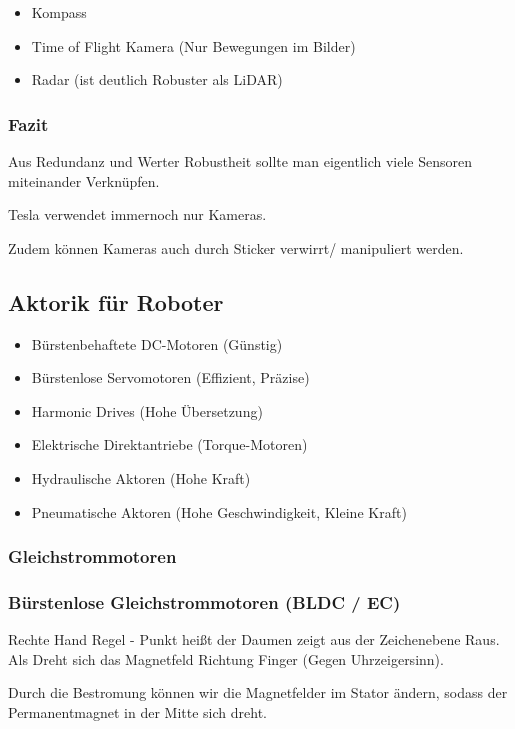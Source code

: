 \documentclass[a4paper]{article}
\begin{document}
\begin{itemize}
    \item Kompass
    \item Time of Flight Kamera (Nur Bewegungen im Bilder)
    \item Radar (ist deutlich Robuster als LiDAR)
\end{itemize}

\subsubsection{Fazit}

Aus Redundanz und Werter Robustheit sollte man eigentlich viele Sensoren miteinander Verknüpfen.

Tesla verwendet immernoch nur Kameras.

Zudem können Kameras auch durch Sticker verwirrt/ manipuliert werden.

\subsection{Aktorik für Roboter}

\begin{itemize}
    \item Bürstenbehaftete DC-Motoren (Günstig)
    \item Bürstenlose Servomotoren (Effizient, Präzise)
    \item Harmonic Drives (Hohe Übersetzung)
    \item Elektrische Direktantriebe (Torque-Motoren)
    \item Hydraulische Aktoren (Hohe Kraft)
    \item Pneumatische Aktoren (Hohe Geschwindigkeit, Kleine Kraft)
\end{itemize}

\subsubsection{Gleichstrommotoren}

\subsubsection{Bürstenlose Gleichstrommotoren (BLDC / EC)}

Rechte Hand Regel - Punkt heißt der Daumen zeigt aus der Zeichenebene Raus. Als Dreht sich das Magnetfeld Richtung Finger (Gegen Uhrzeigersinn).

Durch die Bestromung können wir die Magnetfelder im Stator ändern, sodass der Permanentmagnet in der Mitte sich dreht.
\end{document}
